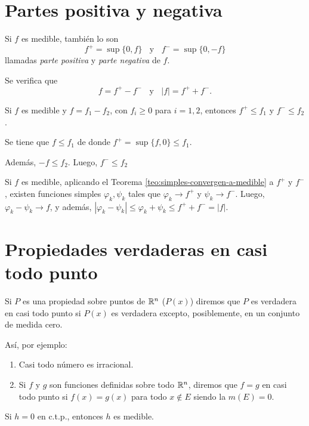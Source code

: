 \section{Partes positiva y negativa}

Si $f$ es medible, tambi\'en lo son 
\[
f^+=\sup\{0,f \}\;\;\mbox{ y }\;\;f^{-}=\sup\{0,-f\}
\]
llamadas \emph{parte positiva} y \emph{parte negativa} de $f$.

Se verifica que 
\[
f=f^{+}-f^{-}\;\;\mbox{ y }\;\; |f|=f^{+}+f^{-}.
\]

\begin{teorema}{}
Si $f$ es medible y $f=f_1-f_2$, con $f_i\geq 0$ para $i=1,2$, entonces
$f^{+}\leq f_1$ y $f^{-}\leq f_2$.
\end{teorema}

\begin{demo}
Se tiene que $f\leq f_1$ de donde $f^+=\sup\{ f,0\}\leq f_1$. 

Adem\'as, $-f \leq f_2$. Luego, $f^{-}\leq f_2$
\end{demo}

Si $f$ es medible,  aplicando el Teorema \ref{teo:simples-convergen-a-medible} a $f^+$ y $f^{-}$, 
existen funciones simples $\varphi_k,\psi_k$ tales que $\varphi_k \to f^+$
y $\psi_k \to f^{-}$. Luego, 
$\varphi_k - \psi_k \to f$, y adem\'as, $|\varphi_k-\psi_k|\leq \varphi_k+\psi_k \leq f^{+}+f^{-}=|f|$.

\section{Propiedades verdaderas en casi todo punto}

Si $P$ es una propiedad sobre puntos de $\mathbb{R}^n$ ($P(x)$) diremos que $P$ es verdadera en casi todo punto si $P(x)$ es verdadera excepto, posiblemente, en un conjunto de medida cero. 

As\'i, por ejemplo:
\begin{enumerate}
    \item Casi todo n\'umero es irracional.
    \item  Si $f$ y $g$ son funciones definidas sobre todo $\mathbb{R}^n$, diremos que $f=g$ en casi todo punto si $f(x)=g(x)$ para todo  
    $x \notin E$  siendo la  $m(E)=0$.
\end{enumerate}

\begin{teorema}{}
Si $h=0$ en c.t.p., entonces $h$ es medible.
\end{teorema}

